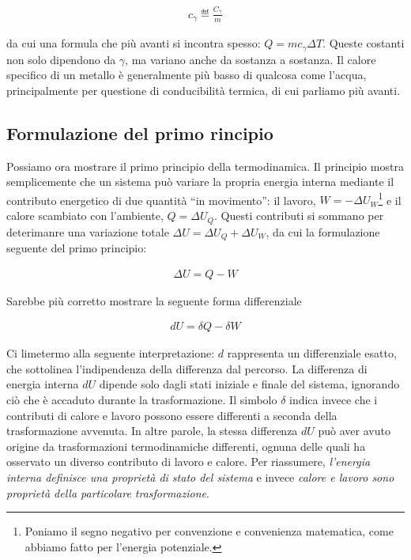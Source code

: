 \begin{align}
    c_\gamma \eqdef \frac{C_\gamma}{m}
\end{align}

\noindent da cui una formula che più avanti si incontra spesso:
$Q = mc_\gamma \Delta T$. Queste costanti non solo dipendono da
$\gamma$, ma variano anche da sostanza a sostanza. Il calore
specifico di un metallo è generalmente più basso di qualcosa
come l'acqua, principalmente per questione di conducibilità termica,
di cui parliamo più avanti.


\subsection{Formulazione del primo rincipio}
Possiamo ora mostrare il primo principio della termodinamica. Il principio
mostra semplicemente che un sistema può variare la propria energia interna
mediante il contributo energetico di due quantità ``in movimento'': il lavoro,
$W = -\Delta U_W$\footnote{Poniamo il segno negativo per convenzione e convenienza matematica, come abbiamo fatto per l'energia potenziale.}
e il calore scambiato con l'ambiente, $Q = \Delta U_Q$. Questi contributi si sommano per deterimanre una
variazione totale $\Delta U = \Delta U_Q  + \Delta U_W$, da cui la formulazione
seguente del primo principio:

\begin{align}
    \Delta U = Q - W\label{firstprincip}
\end{align}

\noindent Sarebbe più corretto mostrare la seguente forma differenziale

\begin{tcolorbox}[colback = red!30, colframe = red!30!black, title = {Primo principio della termodinamica}]
\begin{align}
    dU = \delta Q - \delta W
\end{align}
\end{tcolorbox}

\noindent Ci limetermo alla seguente interpretazione: $d$ rappresenta
un differenziale esatto, che sottolinea l'indipendenza della differenza
dal percorso. La differenza di energia interna $dU$ dipende solo dagli
stati iniziale e finale del sistema, ignorando ciò che è accaduto durante la
trasformazione.
Il simbolo $\delta$ indica invece che i contributi di calore e lavoro
possono essere differenti a seconda della trasformazione
avvenuta. In altre parole, la stessa differenza $dU$ può aver
avuto origine da trasformazioni termodinamiche differenti, ognuna
delle quali ha osservato un diverso contributo di lavoro e calore.
Per riassumere, \textit{l'energia interna definisce una proprietà
di stato del sistema} e invece \textit{calore e lavoro sono proprietà
della particolare trasformazione}.

